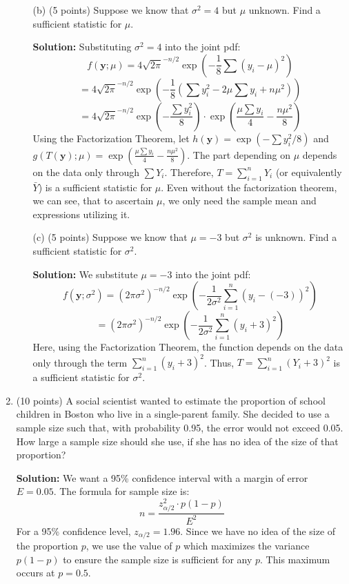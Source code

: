 \documentclass[12pt,letterpaper]{article}
\begin{document}
\begin{enumerate}[leftmargin=*]
\begin{itemize}
    
    \item[(b)] (5 points) Suppose we know that $\sigma^2 = 4$ but $\mu$ unknown. Find a sufficient statistic for $\mu$.
    
    \textbf{Solution:}
    Substituting $\sigma^2=4$ into the joint pdf:
    \[ f(\textbf{y}; \mu) = 4\sqrt{2\pi}^{-n/2} \exp\left( -\frac{1}{8} \sum (y_i - \mu)^2 \right) \]
    \[ = 4\sqrt{2\pi}^{-n/2}\exp\left( -\frac{1}{8} (\sum y_i^2 - 2\mu \sum y_i + n\mu^2) \right) \]
    \[ = 4\sqrt{2\pi} ^{-n/2} \exp\left( -\frac{\sum y_i^2}{8} \right) \cdot \exp\left( \frac{\mu \sum y_i}{4} - \frac{n\mu^2}{8} \right) \]
    Using the Factorization Theorem, let $h(\textbf{y}) = \exp(-\sum y_i^2 / 8)$ and $g(T(\textbf{y}); \mu) = \exp(\frac{\mu \sum y_i}{4} - \frac{n\mu^2}{8})$. The part depending on $\mu$ depends on the data only through $\sum Y_i$. Therefore, $T = \sum_{i=1}^n Y_i$ (or equivalently $\bar{Y}$) is a sufficient statistic for $\mu$. Even without the factorization theorem, we can see, that to ascertain $\mu$, we only need the sample mean and expressions utilizing it.
    
    \item[(c)] (5 points) Suppose we know that $\mu = -3$ but $\sigma^2$ is unknown. Find a sufficient statistic for $\sigma^2$.
    
    \textbf{Solution:}
    We substitute $\mu = -3$ into the joint pdf:
    \[ f(\textbf{y}; \sigma^2) = (2\pi\sigma^2)^{-n/2} \exp\left( -\frac{1}{2\sigma^2} \sum_{i=1}^n (y_i - (-3))^2 \right) \]
    \[ = (2\pi\sigma^2)^{-n/2} \exp\left( -\frac{1}{2\sigma^2} \sum_{i=1}^n (y_i + 3)^2 \right) \]
    Here, using the Factorization Theorem, the function depends on the data only through the term $\sum_{i=1}^n (y_i + 3)^2$. Thus, $T = \sum_{i=1}^n (Y_i + 3)^2$ is a sufficient statistic for $\sigma^2$.
    
\end{itemize}


\item (10 points) A social scientist wanted to estimate the proportion of school children in Boston who live in a single-parent family. She decided to use a sample size such that, with probability 0.95, the error would not exceed 0.05. How large a sample size should she use, if she has no idea of the size of that proportion?

\textbf{Solution:}
We want a 95\% confidence interval with a margin of error $E = 0.05$. The formula for sample size is:
\[ n = \frac{z_{\alpha/2}^2 \cdot p(1-p)}{E^2} \]
For a 95\% confidence level, $z_{\alpha/2} = 1.96$. Since we have no idea of the size of the proportion $p$, we use the value of $p$ which maximizes the variance $p(1-p)$ to ensure the sample size is sufficient for any $p$. This maximum occurs at $p=0.5$.


\end{enumerate}
\end{document}
